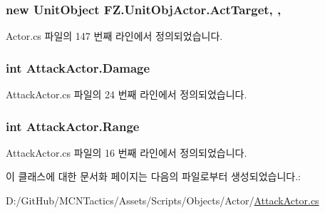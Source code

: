 \subsubsection[{\texorpdfstring{Act\+Target}{ActTarget}}]{\setlength{\rightskip}{0pt plus 5cm}new {\bf Unit\+Object} F\+Z.\+Unit\+Obj\+Actor.\+Act\+Target\hspace{0.3cm}{\ttfamily [get]}, {\ttfamily [protected]}, {\ttfamily [inherited]}}\hypertarget{class_f_z_1_1_unit_obj_actor_a9343320a7b31731b88fa6ab91d649328}{}\label{class_f_z_1_1_unit_obj_actor_a9343320a7b31731b88fa6ab91d649328}


Actor.\+cs 파일의 147 번째 라인에서 정의되었습니다.

\subsubsection[{\texorpdfstring{Damage}{Damage}}]{\setlength{\rightskip}{0pt plus 5cm}int Attack\+Actor.\+Damage\hspace{0.3cm}{\ttfamily [get]}}\hypertarget{class_attack_actor_aaa126531b12eeb6d03311d761697cc84}{}\label{class_attack_actor_aaa126531b12eeb6d03311d761697cc84}


Attack\+Actor.\+cs 파일의 24 번째 라인에서 정의되었습니다.

\subsubsection[{\texorpdfstring{Range}{Range}}]{\setlength{\rightskip}{0pt plus 5cm}int Attack\+Actor.\+Range\hspace{0.3cm}{\ttfamily [get]}}\hypertarget{class_attack_actor_aa331a3d1fbebd46a2458c64b209af927}{}\label{class_attack_actor_aa331a3d1fbebd46a2458c64b209af927}


Attack\+Actor.\+cs 파일의 16 번째 라인에서 정의되었습니다.



이 클래스에 대한 문서화 페이지는 다음의 파일로부터 생성되었습니다.\+:\begin{DoxyCompactItemize}
\item 
D\+:/\+Git\+Hub/\+M\+C\+N\+Tactics/\+Assets/\+Scripts/\+Objects/\+Actor/\hyperlink{_attack_actor_8cs}{Attack\+Actor.\+cs}\end{DoxyCompactItemize}
